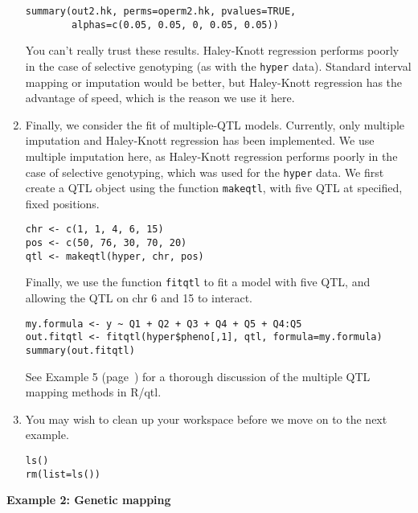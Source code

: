 \documentclass[10pt,letterpaper]{article}
\newcommand{\usercolor}{\color [named]{BlueViolet}}
\begin{document}
\begin{enumerate}
\usercolor
\verb|summary(out2.hk, perms=operm2.hk, pvalues=TRUE,| \\
\verb|        alphas=c(0.05, 0.05, 0, 0.05, 0.05))|
\normalcolor

You can't really trust these results.  Haley-Knott regression performs
poorly in the case of selective genotyping (as with the \verb-hyper-
data).  Standard interval mapping or imputation would be better, but
Haley-Knott regression has the advantage of speed, which is the reason
we use it here.

\item Finally, we consider the fit of multiple-QTL models.  Currently,
only multiple imputation and Haley-Knott regression has been
implemented.  We use multiple imputation here, as Haley-Knott
regression performs poorly in the case of selective genotyping,
which was used for the \verb-hyper- data.  We first create a QTL
object using the function \verb-makeqtl-, with five QTL at
specified, fixed positions.

\usercolor
\verb|chr <- c(1, 1, 4, 6, 15)| \\
\verb|pos <- c(50, 76, 30, 70, 20)| \\
\verb|qtl <- makeqtl(hyper, chr, pos)|
\normalcolor

Finally, we use the function \verb-fitqtl- to fit a model with five
QTL, and allowing the QTL on chr 6 and 15 to interact.

\usercolor
\verb|my.formula <- y ~ Q1 + Q2 + Q3 + Q4 + Q5 + Q4:Q5| \\ 
\verb|out.fitqtl <- fitqtl(hyper$pheno[,1], qtl, formula=my.formula)| \\ %
\verb|summary(out.fitqtl)|
\normalcolor

See Example 5 (page~\pageref{example5}) for a thorough discussion of
the multiple QTL mapping methods in R/qtl.

\item You may wish to clean up your workspace before we move on to the
next example.

\usercolor 
\verb|ls()| \\ 
\verb|rm(list=ls())| 
\normalcolor

\end{enumerate}







\vspace{12pt}
\noindent \textbf{Example 2: Genetic mapping} \vspace{6pt}
\nopagebreak
\end{document}
